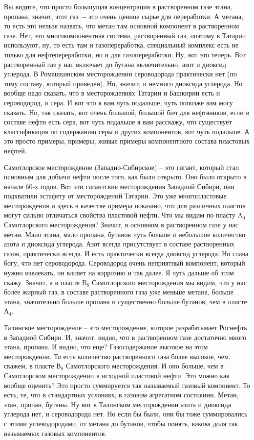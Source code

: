 \documentclass[main.tex]{subfiles}
\begin{document}
Вы видите, что просто большущая концентрация в растворенном газе этана, пропана, значит, этот газ –- это очень ценное сырье для переработки.
А метана, то есть это нельзя назвать, что метан там основной компонент в растворенном газе.
Нет, это многокомпонентная система, растворенный газ, поэтому в Татарии используют, ну, то есть там и газопереработка, специальный комплекс есть не только для нефтепереработки, но и для газопереработки.
Ну, вот это теперь.
Вот растворенный газ у нас включает до бутана включительно, азот и диоксид углерода.
В Ромашкинском месторождении сероводорода практически нет (по тому составу, который приведен).
Но, значит, и немного диоксида углерода.
Но вообще надо сказать, что в месторождениях Татарии и Башкирии есть и сероводород, и сера.
И вот что я вам чуть подальше, чуть попозже вам могу сказать.
Но, так сказать, вот очень большой, большой бич для нефтяников, если в составе нефти есть сера, вот чуть подальше я вам расскажу, что существует классификация по содержанию серы и других компонентов, вот чуть подальше.
А это просто примеры, примеры, живые примеры компонентного состава пластовых нефтей.

Самотлорское месторождение (Западно-Сибирское) -- это гигант, который стал основным для добычи нефти после того, как были открыто.
Оно было открыто в начале 60-х годов.
Вот эти гигантские месторождения Западной Сибири, они подхватили эстафету от месторождений Татарии.
Это уже многопластовые месторождения и здесь в качестве примера показано, что для различных пластов могут сильно отличаться свойства пластовой нефти.
Что мы видим по пласту A$_4$ Самотлорского месторождения?
Значит, в основном в растворенном газе у нас метан.
Мало этана, мало пропана, бутанов чуть больше и небольшое количество азота и диоксида углерода.
Азот всегда присутствует в составе растворенных газов, практически всегда.
И есть практически всегда диоксид углерода.
Но слава богу, что нет сероводорода.
Сероводород очень неприятный компонент, который нужно извлекать, он влияет на коррозию и так далее.
Я чуть дальше об этом скажу.
Значит, а в пласте B$_8$ Самотлорского месторождения мы видим, что у нас более жирный газ, в составе растворенного газа уже меньше метана, больше этана, значительно больше пропана
и существенно больше бутанов, чем в пласте А$_4$.

Талинское месторождение -- это месторождение, которое разрабатывает Роснефть в Западной Сибири.
И, значит, видно, что в растворенном газе достаточно много этана, пропана.
И видно, что еще?
Газосодержание высокое на этом месторождении.
То есть количество растворенного газа более высокое, чем, скажем, в пласте В$_8$ Самотлорского месторождения.
И оно больше, чем в Самотлорском месторождении в исходной пластовой нефти.
Это можно как вообще оценить?
Это просто суммируется так называемый газовый компонент.
То есть, те, что в стандартных условиях, в газовом агрегатном состоянии.
Метан, этан, пропан, бутаны.
Ну вот в Талинском месторождении азота и диоксида углерода нет, и сероводорода нет.
Но если бы были, они бы тоже суммировались с этими углеводородами, от метана до бутанов, чтобы понять, какова доля так называемых газовых компонентов.
\end{document}
